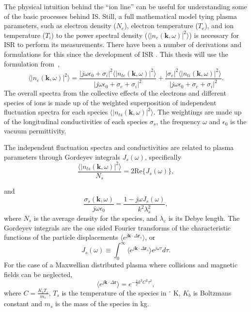The physical intuition behind the ``ion line'' can be useful for understanding some of the basic processes behind IS. Still, a full mathematical model tying plasma parameters, such as electron density ($N_e$), electron temperature ($T_e$),  and ion temperature ($T_i$) to the power spectral density ($\langle \left|n_e(\mathbf{k},\omega)\right|^2\rangle$) is necessary for ISR to perform its measurements. There have been a number of derivations and formulations for this since the development of ISR \citep{dougherty:farley1960,farleydougherty:ISR2,doughteryfarley:ISR3,hagfors1961}. This thesis will use the formulation from~\citet{Kudeki:2006kx,kudeki:milla:1,kudeki:milla:2},
\begin{equation}
\label{eq:mainspeceq:body}
\langle \left|n_e(\mathbf{k},\omega)\right|^2\rangle = \frac{|j\omega\epsilon_0 + \sigma_i|^2 \langle |n_{te}(\mathbf{k},\omega)|^2\rangle}{|j\omega\epsilon_0 +\sigma_e+\sigma_i|^2} + \frac{| \sigma_e|^2 \langle |n_{ti}(\mathbf{k},\omega)|^2\rangle}{|j\omega\epsilon_0 +\sigma_e+\sigma_i|^2}.
\end{equation}
The overall spectra from the collective effects of the electrons and different species of ions is made up of the weighted superposition of independent fluctuation spectra for each species $\langle |n_{ts}(\mathbf{k},\omega)|^2\rangle$. The weightings are made up of the longitudinal conductivities of each species $\sigma_s$, the frequency $\omega$ and $\epsilon_0$ is the vacuum permittivity. 

The independent fluctuation spectra and conductivities are related to plasma parameters through Gordeyev integrals $J_s(\omega)$, specifically 
\begin{equation}
\label{eq:thermalfl:bod}
\frac{\langle|n_{ts}(\mathbf{k},\omega)|^2\rangle}{N_s} = 2\text{Re}\{J_s(\omega)\},
\end{equation}

\noindent and 
\begin{equation}
\label{eq:cond:bod}
\frac{\sigma_{s}(\mathbf{k},\omega)}{j\omega\epsilon_0} = \frac{1-j\omega J_s(\omega)}{k^2\lambda_s^2},
\end{equation}
where $N_s$ is the average density for the species, and $\lambda_{e}$ is its Debye length. The Gordeyev integrals are the one sided Fourier transforms of the characteristic functions of the particle displacements $\langle e^{j\mathbf{k}\cdot\Delta\mathbf{r}_s}\rangle$, or  
\begin{equation}
\label{eq:gord:body}
J_s(\omega)\equiv \int_0^\infty \langle e^{j\mathbf{k}\cdot\Delta \mathbf{r}_s}\rangle e^{j\omega\tau}d\tau.
\end{equation}
For the case of a Maxwellian distributed plasma where collisions and magnetic fields can be neglected,
 \begin{equation}
\label{eq:pdfallc2}
\langle e^{j\mathbf{k}\cdot\Delta \mathbf{r}}\rangle= e^{-\frac{1}{2}k^2C^2 \tau^2},
\end{equation}
where $C=\frac{K_bT_s}{m_s}$, $T_s$ is the temperature of the species in $^\circ$ K, $K_b$ is Boltzmans constant and $m_s$ is the mass of the species in kg.

